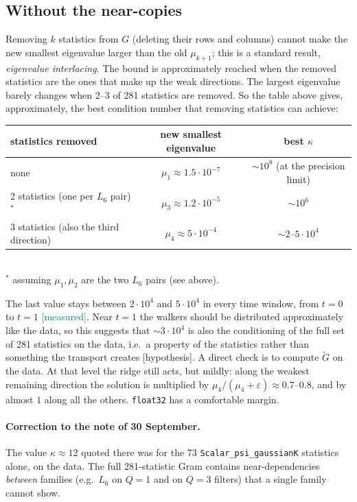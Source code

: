 \documentclass[11pt,a4paper]{article}
\newcommand{\code}[1]{\texttt{#1}}
\newcommand{\meas}{\textcolor{teal}{\textsf{[measured]}}}
\newcommand{\hyp}{\textcolor{orange!80!black}{\textsf{[hypothesis]}}}
\newcommand{\Gt}{\widetilde{G}}
\begin{document}
\subsection{Without the near-copies}
Removing $k$ statistics from $G$ (deleting their rows and columns) cannot make the new smallest
eigenvalue larger than the old $\mu_{k+1}$; this is a standard result, \emph{eigenvalue interlacing}.
The bound is approximately reached when the removed statistics are the ones that make up the weak
directions. The largest eigenvalue barely changes when 2--3 of 281 statistics are removed. So the table
above gives, approximately, the best condition number that removing statistics can achieve:
\begin{center}\small
\begin{tabular}{lcc}
\toprule
statistics removed & new smallest eigenvalue & best $\kappa$\\
\midrule
none & $\mu_1\approx1.5\cdot10^{-7}$ & $\sim10^{8}$ (at the precision limit)\\
2 statistics (one per $L_6$ pair)$^*$ & $\mu_3\approx1.2\cdot10^{-5}$ & $\sim10^{6}$\\
3 statistics (also the third direction) & $\mu_4\approx5\cdot10^{-4}$ & $\sim2$--$5\cdot10^{4}$\\
\bottomrule
\end{tabular}\\[2pt]
{\footnotesize $^*$ assuming $\mu_1,\mu_2$ are the two $L_6$ pairs (see above).}
\end{center}
The last value stays between $2\cdot10^4$ and $5\cdot10^4$ in every time window, from $t=0$ to $t=1$
\meas. Near $t=1$ the walkers should be distributed approximately like the data, so this suggests that
$\sim3\cdot10^4$ is also the conditioning of the full set of 281 statistics on the data, i.e.\ a property
of the statistics rather than something the transport creates \hyp. A direct check is to compute $\Gt$ on
the data. At that level the ridge still acts, but mildly: along the weakest remaining direction the
solution is multiplied by $\mu_4/(\mu_4+\varepsilon)\approx0.7$--$0.8$, and by almost $1$ along all the
others. \code{float32} has a comfortable margin.

\paragraph{Correction to the note of 30 September.} The value $\kappa\approx12$ quoted there was for the
73 \code{Scalar\_psi\_gaussianK} statistics alone, on the data. The full 281-statistic Gram contains
near-dependencies \emph{between} families (e.g.\ $L_6$ on $Q=1$ and on $Q=3$ filters) that a single family
cannot show.
\end{document}
